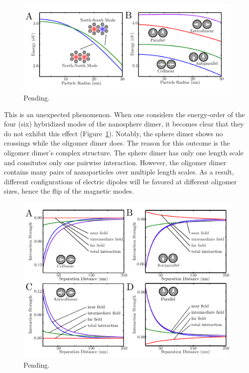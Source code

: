 \documentclass[journal=apchd5,manuscript=article]{achemso}
\begin{document}
\begin{figure}
\begin{center}
\includegraphics{twomer_dimer.pdf}
\caption{Pending.}
\label{twomer_dimer}
\end{center}
\end{figure}

This is an unexpected phenomenon. When one considers the energy-order of the four (six) hybridized modes of the nanosphere dimer, it becomes clear that they do not exhibit this effect (Figure~\ref{twomer_dimer}). Notably, the sphere dimer shows no crossings while the oligomer dimer does. The reason for this outcome is the oligomer dimer's complex structure\cite{Cherqui2016}. The sphere dimer has only one length scale and consitutes only one pairwise interaction. However, the oligomer dimer contains many pairs of nanoparticles over multiple length scales. As a result, different configurations of electric dipoles will be favored at different oligomer sizes, hence the flip of the magnetic modes.

\begin{figure}
\begin{center}
\includegraphics{interactions.pdf}
\caption{Pending.}
\label{int_strength}
\end{center}
\end{figure}
\end{document}
